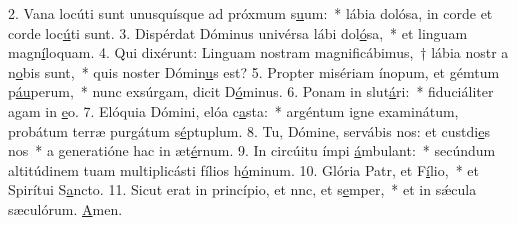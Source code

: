 2. Vana locúti sunt unusquísque ad próxmum s\uline{u}um:~* lábia dolósa, in corde et corde loc\uline{ú}ti sunt.
3. Dispérdat Dóminus univérsa lábi dol\uline{ó}sa,~* et linguam magn\uline{í}loquam.
4. Qui dixérunt: Linguam nostram magnificábimus,~† lábia nostr a n\uline{o}bis sunt,~* quis noster Dómin\uline{u}s est?
5. Propter misériam ínopum, et gémtum p\uline{áu}perum,~* nunc exsúrgam, dicit D\uline{ó}minus.
6. Ponam in slut\uline{á}ri:~* fiduciáliter agam in \uline{e}o.
7. Elóquia Dómini, elóa c\uline{a}sta:~* argéntum igne examinátum, probátum terræ purgátum s\uline{é}ptuplum.
8. Tu, Dómine, servábis nos: et custdi\uline{e}s nos~* a generatióne hac in æt\uline{é}rnum.
9. In circúitu ímpi \uline{á}mbulant:~* secúndum altitúdinem tuam multiplicásti fílios h\uline{ó}minum.
10. Glória Patr, et F\uline{í}lio,~* et Spirítui S\uline{a}ncto.
11. Sicut erat in princípio, et nnc, et s\uline{e}mper,~* et in sǽcula sæculórum. \uline{A}men.
